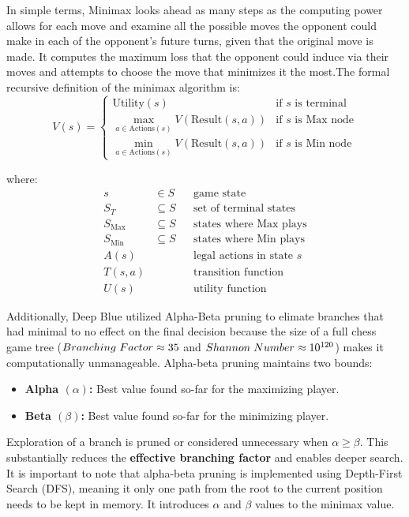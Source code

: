 \documentclass[11pt,a4paper]{report}
\begin{document}
In simple terms, Minimax looks ahead as many steps as the computing power allows for each move and examine all the possible moves
the opponent could make in each of the opponent's future turns, given that the original move is made. It computes the maximum loss
that the opponent could induce via their moves and attempts to choose the move that minimizes it the most.The formal recursive definition
of the minimax algorithm is:
\[
V(s) =
\begin{cases}
\text{Utility}(s) & \text{if } s \text{ is terminal} \\
\max\limits_{a \in \text{Actions}(s)} V(\text{Result}(s,a)) & \text{if } s \text{ is Max node} \\
\min\limits_{a \in \text{Actions}(s)} V(\text{Result}(s,a)) & \text{if } s \text{ is Min node}
\end{cases}
\]

where:
\begin{align*}
s &\in S && \text{game state} \\
S_T &\subseteq S && \text{set of terminal states} \\
S_{\text{Max}} &\subseteq S && \text{states where Max plays} \\
S_{\text{Min}} &\subseteq S && \text{states where Min plays} \\
A(s) &&& \text{legal actions in state } s \\
T(s,a) &&& \text{transition function} \\
U(s) &&& \text{utility function}
\end{align*}

Additionally, Deep Blue utilized Alpha-Beta pruning to elimate branches that had minimal to no effect on the final decision because
the size of a full chess game tree ($Branching \hspace{0.3em} Factor \approx 35$ and $Shannon \hspace{0.3em} Number \approx 10^{120}$)
makes it computationally unmanageable. Alpha-beta pruning maintains two bounds:
\begin{itemize}
    \item \textbf{Alpha $(\alpha)$:} Best value found so-far for the maximizing player.
    \item \textbf{Beta $(\beta)$:} Best value found so-far for the minimizing player.
\end{itemize}
Exploration of a branch is pruned or considered unnecessary when $\alpha \ge \beta$. This substantially reduces the \textbf{effective branching factor}
and enables deeper search. It is important to note that alpha-beta pruning is implemented using Depth-First Search (DFS), meaning it only one path from
the root to the current position needs to be kept in memory. It introduces $\alpha$ and $\beta$ values to the minimax value.
\end{document}
